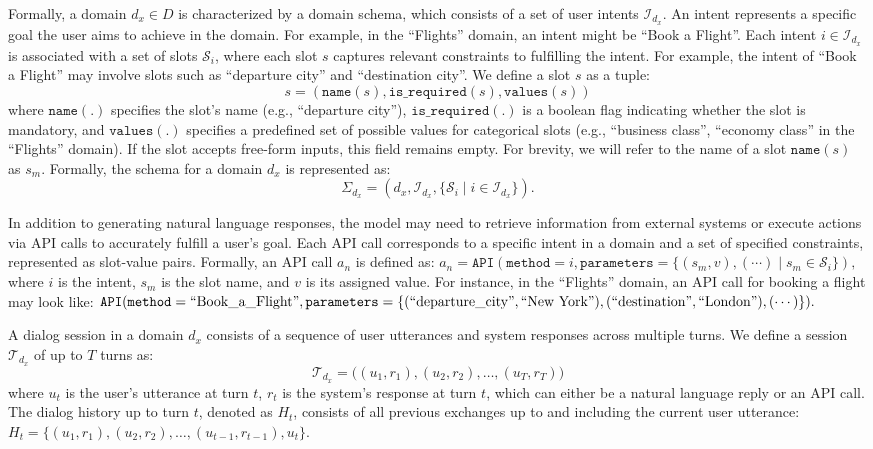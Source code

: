Formally, a domain \( d_x \in D \) is characterized by a domain schema, which consists of a set of user intents \( \mathcal{I}_{d_x} \). 
An intent represents a specific goal the user aims to achieve in the domain. For example, in the ``Flights'' domain, an intent might be ``Book a Flight''.
Each intent \( i \in \mathcal{I}_{d_x} \) is associated with a set of slots \( \mathcal{S}_i \), where each slot $s$ captures relevant constraints to fulfilling the intent. For example, the intent of ``Book a Flight'' may involve slots such as ``departure city'' and ``destination city''. 
We define a slot \( s \) as a tuple:
\[
s = (\texttt{name}(s), \texttt{is\_required}(s), \texttt{values}(s))
\]
where  \( \texttt{name}(.) \) specifies the slot's name (e.g., ``departure city''), \( \texttt{is\_required}(.) \) is a boolean flag indicating whether the slot is mandatory, and \( \texttt{values}(.) \) specifies a predefined set of possible values for categorical slots (e.g., ``business class'', ``economy class'' in the ``Flights'' domain). If the slot accepts free-form inputs, this field remains empty.
For brevity, we will refer to the name of a slot \( \texttt{name}(s) \) as \(s_m\).
Formally, the schema for a domain \( d_x \) is represented as:
\[
\Sigma_{d_x} = (d_x, \mathcal{I}_{d_x}, \{ \mathcal{S}_i \mid i \in \mathcal{I}_{d_x} \}).
\]


In addition to generating natural language responses, the model may need to retrieve information from external systems or execute actions via API calls to accurately fulfill a user's goal. Each API call corresponds to a specific intent in a domain and a set of specified constraints, represented as slot-value pairs.
Formally, an API call $a_n$ is defined as:  
\(
a_n = \texttt{API}(\texttt{method} = i,  \texttt{parameters} = \{(s_m , v), (\cdots) \mid s_m \in \mathcal{S}_i\}),
\)
where  \( i \) is the intent,  \( s_m \) is the slot name, and \( v \) is its assigned value.   
For instance, in the ``Flights'' domain, an API call for booking a flight may look like:  
\(
\texttt{API}(\texttt{method} = \text{``Book\_a\_Flight''}, \texttt{parameters} =\{ (\text{``departure\_city''}, \text{``New York''}), (\text{``destination''},\\ \text{``London''}), (\cdots) \}).
\)  


A dialog session in a domain \( d_x \) consists of a sequence of user utterances and system responses across multiple turns. 
We define a session \( \mathcal{T}_{d_x} \) of up to \( T \) turns as:  
\[
\mathcal{T}_{d_x} = \bigl((u_1, r_1), (u_2, r_2), \dots, (u_T, r_T)\bigr)
\]
where \( u_t \) is the user's utterance at turn \( t \), \( r_t \) is the system's response at turn \( t \), which can either be a natural language reply or an API call. 
The dialog history up to turn \( t \), denoted as \( H_t \), consists of all previous exchanges up to and including the current user utterance:  
\(
H_t = \{(u_1, r_1), (u_2, r_2), \dots, (u_{t-1}, r_{t-1}), u_t\}.
\)




